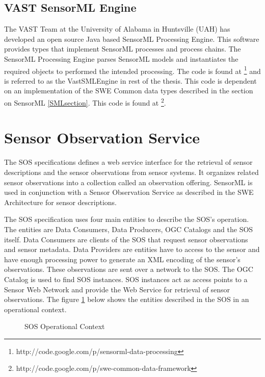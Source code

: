 \documentclass[]{final_report}
\begin{document}
\subsection{VAST SensorML Engine}\label{VastSensorMLEngineSec}
The VAST Team at the University of Alabama in Huntsville (UAH) has developed an open source Java based SensorML Processing Engine. This software provides types that implement SensorML processes and process  chains. The SensorML Processing Engine parses SensorML models and instantiates the required objects to performed the intended processing. The code is found at \footnote{http://code.google.com/p/sensorml-data-processing} and is referred to as the VastSMLEngine in rest of the thesis. This code is dependent on an implementation of the SWE Common data types described in the section on SensorML \ref{SMLsection}. This code is found at \footnote{http://code.google.com/p/swe-common-data-framework}.

\section{Sensor Observation Service}\label{SOSSec}
The SOS specifications defines a web service interface for the retrieval of sensor descriptions and the sensor observations from sensor systems. It organizes related sensor observations into a collection called an observation offering.   
SensorML is used in conjunction with a Sensor Observation Service as described in the SWE Architecture \cite{SOSref} for sensor descriptions.

The SOS specification uses four main entities to describe the SOS's operation. The entities are Data Consumers, Data Producers, OGC Catalogs and the SOS itself. Data Consumers are clients of the SOS that request sensor observations and sensor metadata. Data Providers are entities have to access to the sensor and have enough processing power to generate an XML encoding of the sensor's observations. These observations are sent over a network to the SOS. The OGC Catalog is used to find SOS instances. SOS instances act as access points to a Sensor Web Network and provide the Web Service for retrieval of sensor observations. The figure \ref{fig:SOSoperationContext} below shows the entities described in the SOS in an operational context.
\begin{figure}[h]
\caption{SOS Operational Context}\label{fig:SOSoperationContext}
\end{figure}
\end{document}
